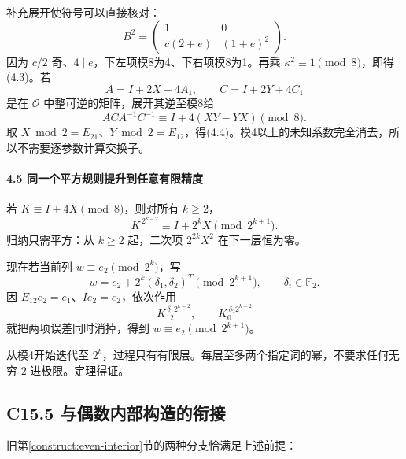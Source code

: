 \documentclass[11pt,a4paper]{article}
\theoremstyle{definition}
\numberwithin{equation}{section}
\begin{document}
{补充展开使符号可以直接核对：} \[
B^2=\begin{pmatrix}1&0\\c(2+e)&(1+e)^2\end{pmatrix}.
\] {因为} \(c/2\) {奇、}\(4\mid e\){，下左项模8为4、下右项模8为1。再乘} \(\kappa^2\equiv1\pmod8\){，即得(4.3)。若} \[
A=I+2X+4A_1,\qquad C=I+2Y+4C_1
\] {是在} \(\mathcal O\) {中整可逆的矩阵，展开其逆至模8给} \[
ACA^{-1}C^{-1}\equiv I+4(XY-YX)\pmod8.
\] {取} \(X\bmod2=E_{21}\){、}\(Y\bmod2=E_{12}\){，得(4.4)。模4以上的未知系数完全消去，所以不需要逐参数计算交换子。}

\paragraph*{\texorpdfstring{{4.5} {同一个平方规则提升到任意有限精度}}{4.5 同一个平方规则提升到任意有限精度}}\label{C15-h112}

{若} \(K\equiv I+4X\pmod8\){，则对所有} \(k\ge2\){，} \[
K^{\,2^{k-2}}\equiv I+2^kX\pmod{2^{k+1}}.
\tag{C15.4.5}
\] {归纳只需平方：从} \(k\ge2\) {起，二次项} \(2^{2k}X^2\) {在下一层恒为零。}

{现在若当前列} \(w\equiv e_2\pmod{2^k}\){，写} \[
w=e_2+2^k(\delta_1,\delta_2)^T
             \pmod{2^{k+1}},\qquad \delta_i\in\mathbb F_2.
\] {因} \(E_{12}e_2=e_1\){、}\(Ie_2=e_2\){，依次作用} \[
K_{12}^{\,\delta_1 2^{k-2}},\qquad
K_0^{\,\delta_2 2^{k-2}}
\tag{C15.4.6}
\] {就把两项误差同时消掉，得到} \(w\equiv e_2\pmod{2^{k+1}}\){。}

{从模4开始迭代至} \(2^b\){，过程只有有限层。每层至多两个指定词的幂，不要求任何无穷} \(2\) {进极限。定理得证。}

\subsection*{\texorpdfstring{{C15.5} {与偶数内部构造的衔接}}{C15.5 与偶数内部构造的衔接}}\label{C15-h113}

{旧}第\ref{construct:even-interior}节{的两种分支恰满足上述前提：}
\end{document}
